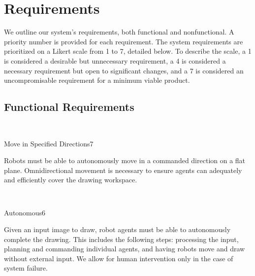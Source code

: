 
\section{Requirements}
\label{sec:requirements}
We outline our system's requirements, both functional and nonfunctional. A priority number is provided for each requirement. The system requirements are prioritized on a Likert scale from 1 to 7, detailed below. To describe the scale, a 1 is considered a desirable but unnecessary requirement, a 4 is considered a necessary requirement but open to significant changes, and a 7 is considered an uncompromisable requirement for a minimum viable product.


\subsection{Functional Requirements}
\label{sec:functional_requirements}

 \\
\begin{functional_requirement}{Move in Specified Directions}{7}
\label{fr:move_in_direction}
\item Robots must be able to autonomously move in a commanded direction on a flat plane. Omnidirectional movement is necessary to ensure agents can adequately and efficiently cover the drawing workspace. 
\end{functional_requirement}

 \\
\begin{functional_requirement}{Autonomous}{6}
\label{fr:autonomous}
\item Given an input image to draw, robot agents must be able to autonomously complete the drawing. This includes the following steps: processing the input, planning and commanding individual agents, and having robots move and draw without external input. We allow for human intervention only in the case of system failure. 
\end{functional_requirement}

